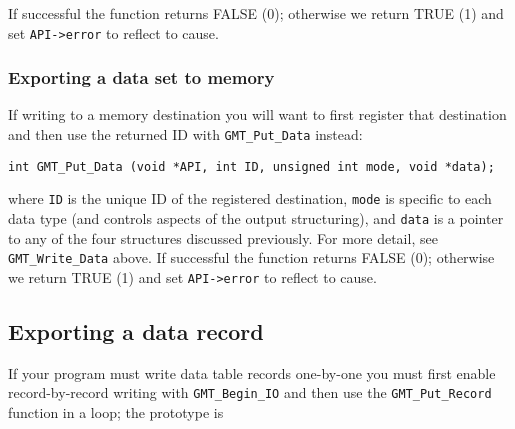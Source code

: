 \documentclass[11pt]{report}
\begin{document}
If successful the function returns FALSE (0); otherwise we return TRUE (1) and set \texttt{API->error} to reflect to cause.

\subsubsection{Exporting a data set to memory}

If writing to a memory destination you will want to first register that destination and then use the returned ID with
\texttt{GMT\_Put\_Data} instead:

\begin{verbatim}
int GMT_Put_Data (void *API, int ID, unsigned int mode, void *data);
\end{verbatim}
where \texttt{ID} is the unique ID of the registered destination, \texttt{mode}
is specific to each data type (and controls aspects of the output structuring),
and \texttt{data} is a pointer to any of the four structures
discussed previously.  For more detail, see \texttt{GMT\_Write\_Data} above.
If successful the function returns FALSE (0); otherwise we return TRUE (1) and set \texttt{API->error} to reflect to cause.


\subsection{Exporting a data record}

If your program must write data table records one-by-one you must first enable record-by-record
writing with \texttt{GMT\_Begin\_IO} and then use the \texttt{GMT\_Put\_Record} function in a loop;
the prototype is
\end{document}
